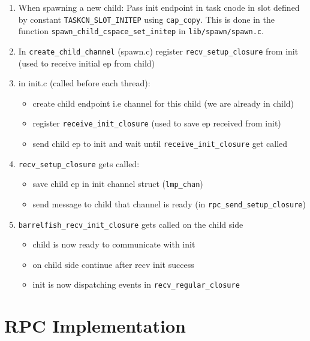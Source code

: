 \begin{enumerate}
    \item When spawning a new child: Pass init endpoint in task cnode in slot defined by constant \verb|TASKCN_SLOT_INITEP| using \verb|cap_copy|. This is done in the function \verb|spawn_child_cspace_set_initep| in \newline
        \verb|lib/spawn/spawn.c|.
    \item In \verb|create_child_channel| (spawn.c) register
    \verb|recv_setup_closure| from init
    (used to receive initial ep from child)
    \item in init.c (called before each thread):
        \begin{itemize}
            \item create child endpoint i.e channel for this child (we are already in child)
            \item register \verb|receive_init_closure| (used to save ep received from init)
            \item send child ep to init and wait until
            \verb|receive_init_closure| get called
        \end{itemize}
    \item \verb|recv_setup_closure| gets called:
        \begin{itemize} 
            \item save child ep in init channel struct (\verb|lmp_chan|)
            \item send message to child that channel is ready (in \newline
                \verb|rpc_send_setup_closure|)
        \end{itemize}
    \item \verb|barrelfish_recv_init_closure| gets called on the child side
        \begin{itemize}
            \item child is now ready to communicate with init
            \item on child side continue after recv init success
            \item init is now dispatching events in \verb|recv_regular_closure|
        \end{itemize}
\end{enumerate}

\section{RPC Implementation}

